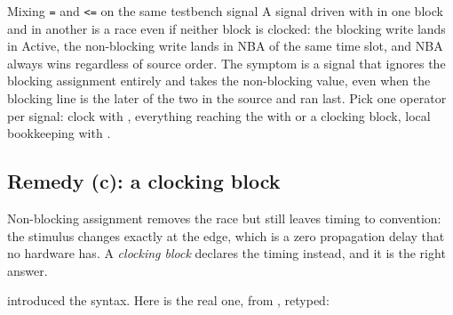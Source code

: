 \begin{gotcha}{Mixing \texttt{=} and \texttt{<=} on the same testbench signal}
A signal driven with \code{=} in one block and \code{<=} in another is a race
even if neither block is clocked: the blocking write lands in Active, the
non-blocking write lands in NBA of the same time slot, and NBA always wins
regardless of source order. The symptom is a signal that ignores the blocking
assignment entirely and takes the non-blocking value, even when the blocking
line is the later of the two in the source and ran last. Pick one operator per signal:
clock with \code{=}, everything reaching the \DUT{} with \code{<=} or a
clocking block, local bookkeeping with \code{=}.
\end{gotcha}

\subsection{Remedy (c): a clocking block}

Non-blocking assignment removes the race but still leaves timing to
convention: the stimulus changes exactly at the edge, which is a zero
propagation delay that no hardware has. A \emph{clocking block} declares the
timing instead, and it is the right answer.

 introduced the syntax. Here is the real one, from
, retyped:


